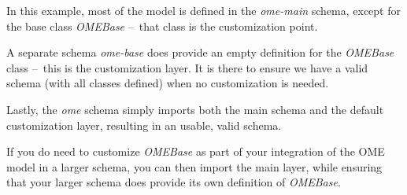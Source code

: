 \begin{frame}[fragile]
{    In this example, most of the model is defined in the \emph{ome-main}
    schema, except for the base class \emph{OMEBase} --~that class is
    the customization point.

    A separate schema \emph{ome-base} does provide an empty definition
    for the \emph{OMEBase} class --~this is the customization layer. It
    is there to ensure we have a valid schema (with all classes defined)
    when no customization is needed.

    Lastly, the \emph{ome} schema simply imports both the main schema
    and the default customization layer, resulting in an usable, valid
    schema.

    If you do need to customize \emph{OMEBase} as part of your
    integration of the OME model in a larger schema, you can then import
    the main layer, while ensuring that your larger schema does provide
    its own definition of \emph{OMEBase}.\par
  }
\end{frame}

